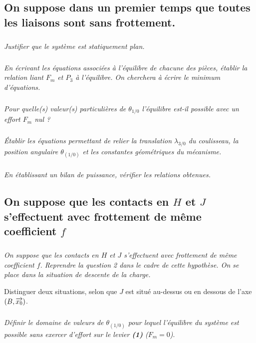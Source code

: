 \documentclass[10pt,fleqn]{article} %
\begin{document}
\begin{multicols}{2}
\subsection*{On suppose dans un premier temps que toutes les liaisons sont sans frottement.}
\subparagraph{}\textit{Justifier que le système est statiquement plan.}
\subparagraph{}\textit{En écrivant les équations associées à l’équilibre de chacune des pièces, établir la relation liant $F_m$ et $P_3$ à l’équilibre.   \textit{On cherchera à écrire le minimum d'équations.}}
\subparagraph{}\textit{Pour quelle(s) valeur(s) particulières de $\theta_{1/0}$ l’équilibre est-il possible avec un effort $F_m$ nul ?}
\subparagraph{}\textit{Établir les équations permettant de relier la translation $\lambda_{3/0}$ du coulisseau, la position angulaire $\theta_{(1/0)}$ et les constantes géométriques du mécanisme.}
\subparagraph{}\textit{En établissant un bilan de puissance, vérifier les relations obtenues.}

\subsection*{On suppose que les contacts en $H$ et $J$ s’effectuent avec frottement de même coefficient $f$}

\subparagraph{}\textit{On suppose que les contacts en $H$ et $J$ s’effectuent avec frottement de même coefficient $f$. Reprendre la question 2 dans le cadre de cette hypothèse. On se place dans la situation de descente de la charge.}

Distinguer deux situations, selon que $J$ est situé au-dessus ou en dessous de l’axe $\left(B,\overrightarrow{x_0}\right)$.
\subparagraph{}\textit{Définir le domaine de valeurs de $\theta_{(1/0)}$ pour lequel l’équilibre du système est possible sans exercer d’effort sur le levier \textbf{(1)} ($F_m = 0$)}.


\ifprof
\else
\end{multicols}
\fi

\end{document}
